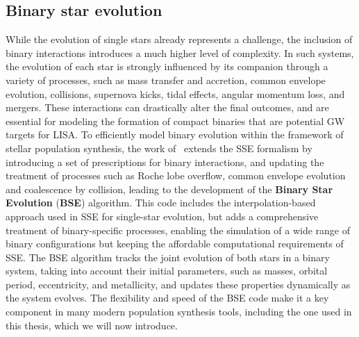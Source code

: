 \subsection{Binary star evolution}
While the evolution of single stars already represents a challenge, the inclusion of binary interactions introduces a much higher level of complexity.
In such systems, the evolution of each star is strongly influenced by its companion through a variety of processes, such as mass transfer and accretion, common envelope evolution, collisions, supernova kicks, tidal effects, angular momentum loss, and mergers.
These interactions can drastically alter the final outcomes, and are essential for modeling the formation of compact binaries that are potential GW targets for LISA. To efficiently model binary evolution within the framework of stellar population synthesis, the work of~\cite{BSE} extends the SSE formalism by introducing a set of prescriptions for binary interactions, and updating the treatment of processes such as Roche lobe overflow, common envelope evolution and coalescence by collision, leading to the development of the \textbf{Binary Star Evolution} (\textbf{BSE}) algorithm.
This code includes the interpolation-based approach used in SSE for single-star evolution, but adds a comprehensive treatment of binary-specific processes, enabling the simulation of a wide range of binary configurations but keeping the affordable computational requirements of SSE.
The BSE algorithm tracks the joint evolution of both stars in a binary system, taking into account their initial parameters, such as masses, orbital period, eccentricity, and metallicity, and updates these properties dynamically as the system evolves.
The flexibility and speed of the BSE code make it a key component in many modern population synthesis tools, including the one used in this thesis, which we will now introduce.

